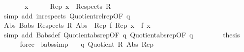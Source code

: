 \begin{isabellebody}
%
\isadelimproof
%
\endisadelimproof
%
\isatagproof
{}\isamarkupfalse%
\ {\isacharminus}{\kern0pt}\isanewline
\ \ \isacommand{{\isacharbraceleft}{\kern0pt}}\isamarkupfalse%
\ \isamarkupfalse%
\ x\isanewline
\ \ \ \ \isamarkupfalse%
\ {\isachardoublequoteopen}Rep{}\ x\ {\isasymin}\ Respects\ R{}{\isachardoublequoteclose}\isanewline
\ \ \ \ \ \ \isamarkupfalse%
\ {\isacharparenleft}{\kern0pt}simp\ add{\isacharcolon}{\kern0pt}\ in{\isacharunderscore}{\kern0pt}respects\ Quotient{}{\isacharunderscore}{\kern0pt}rel{\isacharunderscore}{\kern0pt}rep{\isacharbrackleft}{\kern0pt}OF\ q{}{\isacharbrackright}{\kern0pt}{\isacharparenright}{\kern0pt}\isanewline
\ \ \ \ \isamarkupfalse%
\ \isamarkupfalse%
\ {\isachardoublequoteopen}Abs{}\ {\isacharparenleft}{\kern0pt}Babs\ {\isacharparenleft}{\kern0pt}Respects\ R{}{\isacharparenright}{\kern0pt}\ {\isacharparenleft}{\kern0pt}{\isacharparenleft}{\kern0pt}Abs{}\ {\isacharminus}{\kern0pt}{\isacharminus}{\kern0pt}{\isacharminus}{\kern0pt}{\isachargreater}{\kern0pt}\ Rep{}{\isacharparenright}{\kern0pt}\ f{\isacharparenright}{\kern0pt}\ {\isacharparenleft}{\kern0pt}Rep{}\ x{\isacharparenright}{\kern0pt}{\isacharparenright}{\kern0pt}\ {\isacharequal}{\kern0pt}\ f\ x{\isachardoublequoteclose}\ \isanewline
\ \ \ \ \ \ \isamarkupfalse%
\ {\isacharparenleft}{\kern0pt}simp\ add{\isacharcolon}{\kern0pt}\ Babs{\isacharunderscore}{\kern0pt}def\ Quotient{}{\isacharunderscore}{\kern0pt}abs{\isacharunderscore}{\kern0pt}rep{\isacharbrackleft}{\kern0pt}OF\ q{}{\isacharbrackright}{\kern0pt}\ Quotient{}{\isacharunderscore}{\kern0pt}abs{\isacharunderscore}{\kern0pt}rep{\isacharbrackleft}{\kern0pt}OF\ q{}{\isacharbrackright}{\kern0pt}{\isacharparenright}{\kern0pt}\isanewline
\ \ \isacommand{{\isacharbraceright}{\kern0pt}}\isamarkupfalse%
\isanewline
\ \ \isamarkupfalse%
\ \isamarkupfalse%
\ {\isacharquery}{\kern0pt}thesis\isanewline
\ \ \ \ \isamarkupfalse%
\ force\isanewline
{}\isamarkupfalse%
%
\endisatagproof
{\isafoldproof}%
%
\isadelimproof
\isanewline
%
\endisadelimproof
\isanewline
{}\isamarkupfalse%
\ babs{\isacharunderscore}{\kern0pt}simp{\isacharcolon}{\kern0pt}\isanewline
\ \ \ q{\isacharcolon}{\kern0pt}\ {\isachardoublequoteopen}Quotient{}\ R{}\ Abs\ Rep{\isachardoublequoteclose}\isanewline

\end{isabellebody}
